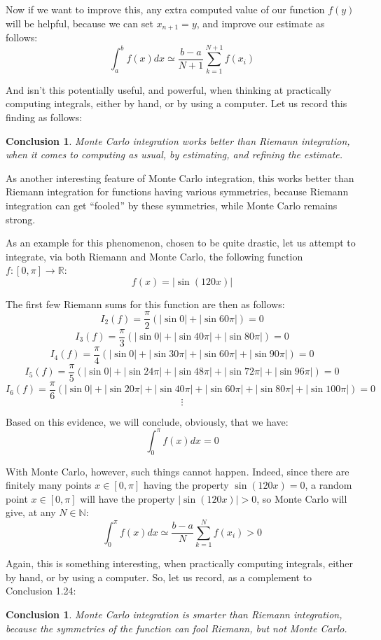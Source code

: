 \documentclass[12pt]{amsbook}
\newtheorem{conclusion}[theorem]{Conclusion}
\begin{document}
Now if we want to improve this, any extra computed value of our function $f(y)$ will be helpful, because we can set $x_{n+1}=y$, and improve our estimate as follows:
$$\int_a^bf(x)dx\simeq\frac{b-a}{N+1}\sum_{k=1}^{N+1}f(x_i)$$

And isn't this potentially useful, and powerful, when thinking at practically computing integrals, either by hand, or by using a computer. Let us record this finding as follows:

\begin{conclusion}
Monte Carlo integration works better than Riemann integration, when it comes to computing as usual, by estimating, and refining the estimate.
\end{conclusion}

As another interesting feature of Monte Carlo integration, this works better than Riemann integration for functions having various symmetries, because Riemann integration can get ``fooled'' by these symmetries, while Monte Carlo remains strong.

\bigskip

As an example for this phenomenon, chosen to be quite drastic, let us attempt to integrate, via both Riemann and Monte Carlo, the following function $f:[0,\pi]\to\mathbb R$:
$$f(x)=\Big|\sin(120x)\Big|$$

The first few Riemann sums for this function are then as follows:
$$I_2(f)=\frac{\pi}{2}(|\sin 0|+|\sin 60\pi|)=0$$
$$I_3(f)=\frac{\pi}{3}(|\sin 0|+|\sin 40\pi|+|\sin 80\pi|)=0$$
$$I_4(f)=\frac{\pi}{4}(|\sin 0|+|\sin 30\pi|+|\sin 60\pi|+|\sin 90\pi|)=0$$
$$I_5(f)=\frac{\pi}{5}(|\sin 0|+|\sin 24\pi|+|\sin 48\pi|+|\sin 72\pi|+|\sin 96\pi|)=0$$
$$I_6(f)=\frac{\pi}{6}(|\sin 0|+|\sin 20\pi|+|\sin 40\pi|+|\sin 60\pi|+|\sin 80\pi|+|\sin 100\pi|)=0$$
$$\vdots$$

Based on this evidence, we will conclude, obviously, that we have:
$$\int_0^\pi f(x)dx=0$$

With Monte Carlo, however, such things cannot happen. Indeed, since there are finitely many points $x\in[0,\pi]$ having the property $\sin(120 x)=0$, a random point $x\in[0,\pi]$ will have the property $|\sin(120 x)|>0$, so Monte Carlo will give, at any $N\in\mathbb N$:
$$\int_0^\pi f(x)dx\simeq\frac{b-a}{N}\sum_{k=1}^Nf(x_i)>0$$

Again, this is something interesting, when practically computing integrals, either by hand, or by using a computer. So, let us record, as a complement to Conclusion 1.24:

\begin{conclusion}
Monte Carlo integration is smarter than Riemann integration, because the symmetries of the function can fool Riemann, but not Monte Carlo.
\end{conclusion}
\end{document}
